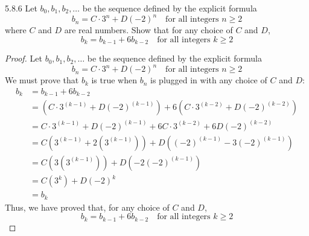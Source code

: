 \begin{question}
    {5.8.6}
    {
        Let $b_0, b_1, b_2, \ldots$ be the sequence defined by the explicit formula
        \begin{equation*}
            b_n = C \cdot 3^n + D{(-2)}^n \quad \text{for all integers $n \geq 2$}
        \end{equation*}
        where $C$ and $D$ are real numbers. Show that for any choice of $C$ and $D$,
        \begin{equation*}
            b_k = b_{k-1} + 6b_{k-2} \quad \text{for all integers $k \geq 2$}
        \end{equation*}
        \vspace{-\baselineskip}
    }
\end{question}
\begin{proof}
    Let $b_0, b_1, b_2, \ldots$ be the sequence defined by the explicit formula
    \begin{equation*}
        b_n = C \cdot 3^n + D{(-2)}^n \quad \text{for all integers $n \geq 2$}
    \end{equation*}
    We must prove that $b_k$ is true when $b_n$ is plugged in with any choice of $C$ and $D$:
    \begin{align*}
        b_k &= b_{k - 1} + 6b_{k - 2} \\
            &= \left (C\cdot 3^{(k - 1)} + D(-2)^{(k - 1)} \right ) + 6 \left (C\cdot 3^{(k - 2)} + D(-2)^{(k - 2)} \right ) \\
            &= C\cdot 3^{(k - 1)} + D(-2)^{(k - 1)} + 6C\cdot 3^{(k - 2)} + 6D(-2)^{(k - 2)} \\
            &= C \left (3^{(k - 1)} + 2 \left (3^{(k - 1)} \right ) \right ) + D \left ((-2)^{(k - 1)} - 3(-2)^{(k - 1)} \right ) \\
            &= C \left (3 \left (3^{(k - 1)} \right ) \right ) + D \left (-2(-2)^{(k - 1)} \right ) \\
            &= C (3^k) + D(-2)^k \\
            &= b_k
    \end{align*}
    Thus, we have proved that, for any choice of $C$ and $D$,
    \begin{equation*}
        b_k = b_{k-1} + 6b_{k-2} \quad \text{for all integers $k \geq 2$}
    \end{equation*}
    \vspace{-\baselineskip}
\end{proof}

